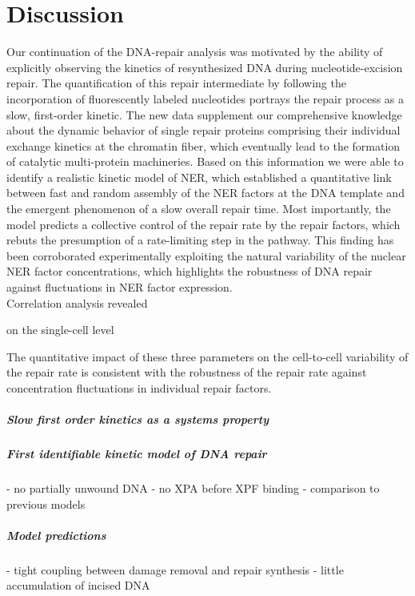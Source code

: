 \chapter{Discussion}


Our continuation of the DNA-repair analysis was motivated by the ability of explicitly observing the kinetics of resynthesized DNA during nucleotide-excision repair. The quantification of this repair intermediate by following the incorporation of fluorescently labeled nucleotides portrays the repair process as a slow, first-order kinetic. The new data supplement our comprehensive knowledge about the dynamic behavior of single repair proteins comprising their individual exchange kinetics at the chromatin fiber, which eventually lead to the formation of catalytic multi-protein machineries. Based on this information we were able to identify a realistic kinetic model of NER, which established a quantitative link between fast and random assembly of the NER factors at the DNA template and the emergent phenomenon of a slow overall repair time. Most importantly, the model predicts a collective control of the repair rate by the repair factors, which rebuts the presumption of a rate-limiting step in the pathway. This finding has been corroborated experimentally exploiting the natural variability of the nuclear NER factor concentrations, which highlights the robustness of DNA repair against fluctuations in NER factor expression.\\       
Correlation analysis revealed 

on the single-cell level

The quantitative impact of these three parameters on the cell-to-cell variability of the repair rate is consistent with the robustness of the repair rate against concentration fluctuations in individual repair factors.


\paragraph{Slow first order kinetics as a systems property}



\paragraph{First identifiable kinetic model of DNA repair}
- no partially unwound DNA
- no XPA before XPF binding
- comparison to previous models 


\paragraph{Model predictions}
- tight coupling between damage removal and repair synthesis
- little accumulation of incised DNA


